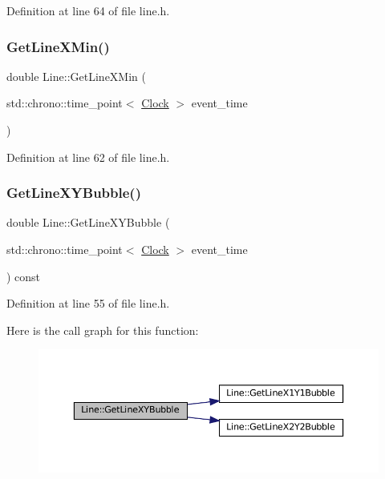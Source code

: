 Definition at line 64 of file line.\+h.

\mbox{\label{class_line_ac4a6e8f232b529169d91b9f44496933b}} 
\subsubsection{\texorpdfstring{Get\+Line\+X\+Min()}{GetLineXMin()}}
{\footnotesize\ttfamily double Line\+::\+Get\+Line\+X\+Min (\begin{DoxyParamCaption}\item[{std\+::chrono\+::time\+\_\+point$<$ \mbox{\hyperlink{universe_8h_a0ef8d951d1ca5ab3cfaf7ab4c7a6fd80}{Clock}} $>$}]{event\+\_\+time }\end{DoxyParamCaption})\hspace{0.3cm}{\ttfamily [inline]}}



Definition at line 62 of file line.\+h.

\mbox{\label{class_line_a8752cfce7330fbeda936778b77e534d0}} 
\subsubsection{\texorpdfstring{Get\+Line\+X\+Y\+Bubble()}{GetLineXYBubble()}}
{\footnotesize\ttfamily double Line\+::\+Get\+Line\+X\+Y\+Bubble (\begin{DoxyParamCaption}\item[{std\+::chrono\+::time\+\_\+point$<$ \mbox{\hyperlink{universe_8h_a0ef8d951d1ca5ab3cfaf7ab4c7a6fd80}{Clock}} $>$}]{event\+\_\+time }\end{DoxyParamCaption}) const\hspace{0.3cm}{\ttfamily [inline]}}



Definition at line 55 of file line.\+h.

Here is the call graph for this function\+:\nopagebreak
\begin{figure}[H]
\begin{center}
\leavevmode
\includegraphics[width=350pt]{class_line_a8752cfce7330fbeda936778b77e534d0_cgraph}
\end{center}
\end{figure}
\mbox{\label{class_line_ac09a53b36a300c38191269f110c73eb1}} 
